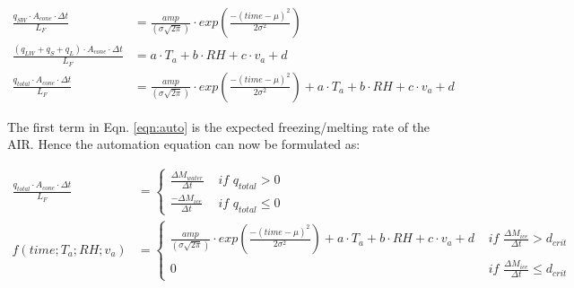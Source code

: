 \documentclass[utf8]{frontiersSCNS}
\begin{document}
\begin{subequations}

	\begin{align}
		\label{eqn:SW}
    \frac{q_{SW} \cdot A_{cone} \cdot \Delta t}{L_F} & = \frac{amp}{(\sigma \sqrt{2\pi})} \cdot
    exp\left(\frac{-(time-\mu)^2}{2\sigma^2}\right) \\
		\label{eqn:T}
    \frac{(q_{LW} + q_{S} + q_{L}) \cdot A_{cone} \cdot \Delta t}{L_F} & = a \cdot T_a + b \cdot RH + c \cdot v_a +
  d \\
		\label{eqn:auto}
    \frac{q_{total} \cdot A_{cone} \cdot \Delta t}{L_F} & = \frac{amp}{(\sigma \sqrt{2\pi})} \cdot
    exp\left(\frac{-(time-\mu)^2}{2\sigma^2}\right) + a \cdot T_a + b \cdot RH + c \cdot v_a + d
	\end{align}
\end{subequations}

The first term in Eqn. \ref{eqn:auto} is the expected freezing/melting rate of the AIR. Hence the automation
equation can now be formulated as:

\begin{subequations}
	\begin{align}
		\label{eqn:SW}
  \frac{q_{total} \cdot A_{cone} \cdot \Delta t}{L_F} & = \left\{ \begin{array}{ll}
		\frac{\Delta M_{water}}{\Delta t} & \textit{ if } q_{total} > 0 \\
		\frac{-\Delta M_{ice}}{\Delta t} & \textit{ if } q_{total} \leq 0
	\end{array} \right. \\
  f(time;T_a;RH;v_a) & = \left\{ \begin{array}{ll}
		\frac{amp}{(\sigma \sqrt{2\pi})} \cdot
    exp\left(\frac{-(time-\mu)^2}{2\sigma^2}\right) + a \cdot T_a + b \cdot RH + c \cdot v_a + d
    & \textit{ if } \frac{\Delta M_{ice}}{\Delta t} > d_{crit} \\
		0 & \textit{ if } \frac{\Delta M_{ice}}{\Delta t} \leq d_{crit}
	\end{array} \right.
	\end{align}
\end{subequations}

\end{document}
